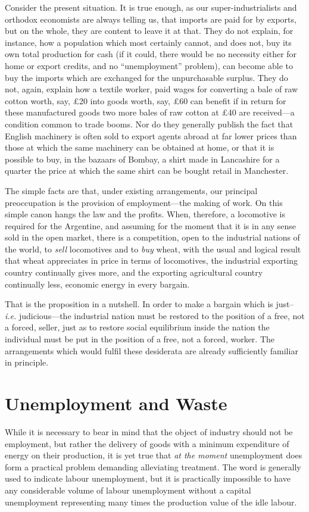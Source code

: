 \documentclass{book}
\begin{document}
Consider the present situation. It is true enough, as our super-industrialists and orthodox economists are always telling us, that imports are paid for by exports, but on the whole, they are content to leave it at that. They do not explain, for instance, how a population which most certainly cannot, and does not, buy its own total production for cash (if it could, there would be no necessity either for home or export credits, and no “unemployment” problem), can become able to buy the imports which are exchanged for the unpurchasable surplus. They do not, again, explain how a textile worker, paid wages for converting a bale of raw cotton worth, say, £20 into goods worth, say, £60 can benefit if in return for these manufactured goods two more bales of raw cotton at £40 are received—a condition common to trade booms. Nor do they generally publish the fact that English machinery is often sold to export agents abroad at far lower prices than those at which the same machinery can be obtained at home, or that it is possible to buy, in the bazaars of Bombay, a shirt made in Lancashire for a quarter the price at which the same shirt can be bought retail in Manchester.

The simple facts are that, under existing arrangements, our principal preoccupation is the provision of employment—the making of work. On this simple canon hangs the law and the profits. When, therefore, a locomotive is required for the Argentine, and assuming for the moment that it is in any sense sold in the open market, there is a competition, open to the industrial nations of the world, to \emph{sell} locomotives and to \emph{buy} wheat, with the usual and logical result that wheat appreciates in price in terms of locomotives, the industrial exporting country continually gives more, and the exporting agricultural country continually less, economic energy in every bargain.

That is the proposition in a nutshell. In order to make a bargain which is just–\emph{i.e.} judicious—the industrial nation must be restored to the position of a free, not a forced, seller, just as to restore social equilibrium inside the nation the individual must be put in the position of a free, not a forced, worker. The arrangements which would fulfil these desiderata are already sufficiently familiar in principle.

\chapter{Unemployment and Waste}
\label{chapter-8}
While it is necessary to bear in mind that the object of industry should not be employment, but rather the delivery of goods with a minimum expenditure of energy on their production, it is yet true that \emph{at the moment} unemployment does form a practical problem demanding alleviating treatment. The word is generally used to indicate labour unemployment, but it is practically impossible to have any considerable volume of labour unemployment without a capital unemployment representing many times the production value of the idle labour.
\end{document}
